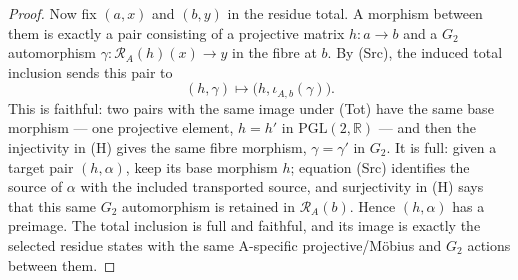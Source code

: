 \documentclass[11pt]{article}
\newcommand{\RR}{\mathbb{R}}
\theoremstyle{plain}
\theoremstyle{definition}
\theoremstyle{remark}
\begin{document}
\begin{proof}
Now fix $(a,x)$ and $(b,y)$ in the residue total.  A morphism between them
is exactly a pair consisting of a projective matrix $h:a\to b$ and a
$G_2$ automorphism
$\gamma:\mathcal R_A(h)(x)\to y$ in the fibre at $b$.  By \textup{(Src)},
the induced total inclusion sends this pair to
\[
  (h,\gamma)\longmapsto
  \bigl(h,\iota_{A,b}(\gamma)\bigr).                    \tag{Tot}
\]
This is faithful: two pairs with the same image under \textup{(Tot)} have
the same base morphism --- one projective element, $h=h'$ in
$\mathrm{PGL}(2,\RR)$ --- and then the injectivity in \textup{(H)} gives
the same fibre morphism, $\gamma=\gamma'$ in $G_2$.  It is full: given a
target pair $(h,\alpha)$, keep its base morphism $h$; equation
\textup{(Src)} identifies the source of $\alpha$ with the included
transported source, and surjectivity in \textup{(H)} says that this same
$G_2$ automorphism is retained in $\mathcal R_A(b)$.  Hence
$(h,\alpha)$ has a preimage.  The total inclusion is full and faithful, and
its image is exactly the selected residue states with the same A-specific
projective/M\"obius and $G_2$ actions between them.
\end{proof}
\end{document}
